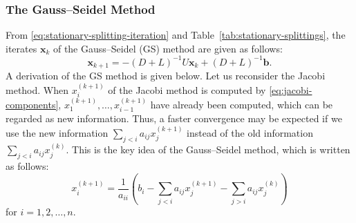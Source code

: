 \subsubsection{{The Gauss--Seidel Method}}\label{subsec:gauss-seidel-method}
{From \eqref{eq:stationary-splitting-iteration} and Table~\ref{tab:stationary-splittings}, the iterates $\bm x_k$ of the Gauss--Seidel (GS) method are given as follows:}
\[\bm x_{k+1}=-(D+L)^{-1}U\bm x_k+(D+L)^{-1}\bm b.\]
{A derivation of the GS method is given below. Let us reconsider the Jacobi method. When $x_i^{(k+1)}$ of the Jacobi method is computed by \eqref{eq:jacobi-components}, $x_1^{(k+1)},\ldots,x_{i-1}^{(k+1)}$ have already been computed, which can be regarded as new information. Thus, a faster convergence may be expected if we use the new information $\sum_{j<i}a_{ij}x_j^{(k+1)}$ instead of the old information $\sum_{j<i}a_{ij}x_j^{(k)}$. This is the key idea of the Gauss--Seidel method, which is written as follows:}
\begin{equation}\label{eq:gauss-seidel-components}
x_i^{(k+1)}=\frac1{a_{ii}}\left(b_i-\sum_{j<i}a_{ij}x_j^{(k+1)}-\sum_{j>i}a_{ij}x_j^{(k)}\right)
\end{equation}
{for $i=1,2,\ldots,n$.}
